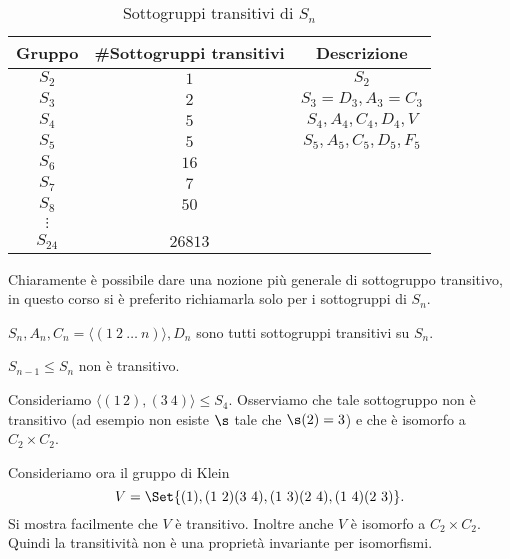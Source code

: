 \begin{table}[tp]
	\caption{Sottogruppi transitivi di \(S_n\)}
	\centering
	\begin{tabular}{ccc}
		\toprule
		\textbf{Gruppo} & \textbf{\#Sottogruppi transitivi} & \textbf{Descrizione}    \\
		\midrule
		\(S_2\)         & \(1\)                             & \(S_2\)                 \\
		\(S_3\)         & \(2\)                             & \(S_3=D_3, A_3=C_3\)    \\
		\(S_4\)         & \(5\)                             & \(S_4,A_4,C_4,D_4,V\)   \\
		\(S_5\)         & \(5\)                             & \(S_5,A_5,C_5,D_5,F_5\) \\
		\(S_6\)         & \(16\)                                                      \\
		\(S_7\)         & \(7\)                                                       \\
		\(S_8\)         & \(50\)                                                      \\
		\(\vdots\)                                                                    \\
		\(S_{24}\)      & \(26813\)                                                   \\
		\bottomrule
	\end{tabular}
\end{table}

\begin{oss}
	Chiaramente è possibile dare una nozione più generale di sottogruppo transitivo, in questo corso si è preferito richiamarla solo per i sottogruppi di \(S_n\).
\end{oss}

\begin{ese}
	\(S_n,A_n,C_n=\langle(1\ 2\ \ldots\ n)\rangle, D_n\) sono tutti sottogruppi transitivi su \(S_n\).
	
	\(S_{n-1}\le S_n\) non è transitivo.
\end{ese}

\begin{ese}
	Consideriamo \(\langle(1\, 2),(3\ 4)\rangle\le S_4\). Osserviamo che tale sottogruppo non è transitivo (ad esempio non esiste \(\s\) tale che \(\s(2)=3\)) e che è isomorfo a \(C_2\times C_2\).
	
	Consideriamo ora il gruppo di Klein
	\[
		V = \Set{(1),(1\ 2)(3\ 4),(1\ 3)(2\ 4),(1\ 4)(2\ 3)}.
	\]
	Si mostra facilmente che \(V\) è transitivo. Inoltre anche \(V\) è isomorfo a \(C_2\times C_2\).
	Quindi la transitività non è una proprietà invariante per isomorfismi.
\end{ese}

